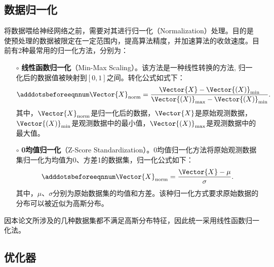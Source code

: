 \subsection{数据归一化}\label{sec:ml_scaler}

将数据喂给神经网络之前，需要对其进行归一化（Normalization）处理。目的是使预处理的数据被限定在一定范围内，提高算法精度，并加速算法的收敛速度。目前有2种最常用的归一化方法，分别为：
\begin{enumerate}
  \item[$\circ$] \textbf{线性函数归一化}（Min-Max Scaling）。该方法是一种线性转换的方法, 归一化后的数据值被映射到$[0,1]$之间。转化公式如式下：
  \begin{equation}\adddotsbeforeeqnnum 
    \label{eq:ml_scale_min_max}
    \Vector{X}_{\text{norm}}=\frac{\Vector{X}-\Vector{(X)}_{\text{min}}}{\Vector{(X)}_{\text{max}}-\Vector{(X)}_{\text{min}}}.
  \end{equation}
  其中，$\Vector{X}_{\text{norm}}$是归一化后的数据，$\Vector{X}$是原始观测数据，$\Vector{(X)}_{\text{min}}$是观测数据中的最小值，$\Vector{(X)}_{\text{max}}$是观测数据中的最大值。
  \item[$\circ$] \textbf{0均值归一化}（Z-Score Standardization）。0均值归一化方法将原始观测数据集归一化为均值为0、方差1的数据集，归一化公式如下：
  \begin{equation}\adddotsbeforeeqnnum 
    \label{eq:ml_scale_z_score}
    \Vector{X}_{\text{norm}}=\frac{\Vector{X}-\mu}{\sigma}.
  \end{equation}
  其中，$\mu$、$\sigma$分别为原始数据集的均值和方差。该种归一化方式要求原始数据的分布可以被近似为高斯分布。
\end{enumerate}

因本论文所涉及的几种数据集都不满足高斯分布特征，因此统一采用线性函数归一化法。

\subsection{优化器}\label{sec:ml_optimizer}

